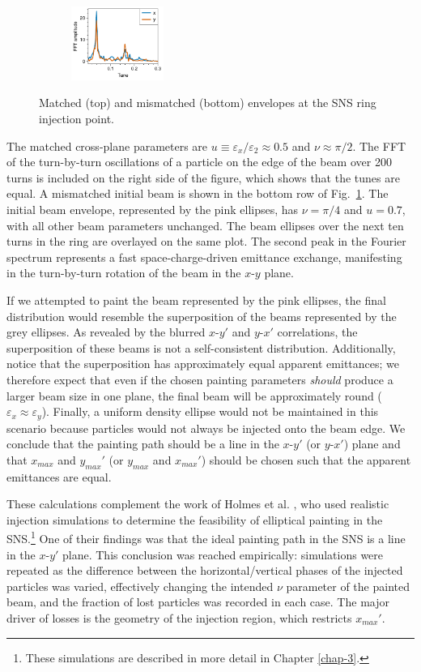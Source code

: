 \begin{figure}[!p]
\begin{subfigure}[b]{\textwidth}
        \includegraphics[width=0.33\textwidth, valign=t]{Images/chapter2/mismatched_env_SNS_fft.pdf}
    \end{subfigure}
    \caption{Matched (top) and mismatched (bottom) envelopes at the SNS ring injection point.}
    \label{fig:matched_env_SNS}
\end{figure}
%
The matched cross-plane parameters are $u \equiv \varepsilon_x / \varepsilon_2 \approx 0.5$ and $\nu \approx \pi / 2$. The FFT of the turn-by-turn oscillations of a particle on the edge of the beam over 200 turns is included on the right side of the figure, which shows that the tunes are equal. A mismatched initial beam is shown in the bottom row of Fig.~\ref{fig:matched_env_SNS}. The initial beam envelope, represented by the pink ellipses, has $\nu = \pi / 4$ and $u = 0.7$, with all other beam parameters unchanged. The beam ellipses over the next ten turns in the ring are overlayed on the same plot. The second peak in the Fourier spectrum represents a fast space-charge-driven emittance exchange, manifesting in the turn-by-turn rotation of the beam in the $x$-$y$ plane. 

If we attempted to paint the beam represented by the pink ellipses, the final distribution would resemble the superposition of the beams represented by the grey ellipses. As revealed by the blurred $x$-$y'$ and $y$-$x'$ correlations, the superposition of these beams is not a self-consistent distribution. Additionally, notice that the superposition has approximately equal apparent emittances; we therefore expect that even if the chosen painting parameters \textit{should} produce a larger beam size in one plane, the final beam will be approximately round ($\varepsilon_x \approx \varepsilon_y$). Finally, a uniform density ellipse would not be maintained in this scenario because particles would not always be injected onto the beam edge. We conclude that the painting path should be a line in the $x$-$y'$ (or $y$-$x'$) plane and that $x_{max}$ and $y_{max}'$ (or $y_{max}$ and $x_{max}'$) should be chosen such that the apparent emittances are equal.

These calculations complement the work of Holmes et al. \cite{Holmes2018}, who used realistic injection simulations to determine the feasibility of elliptical painting in the SNS.\footnote{These simulations are described in more detail in Chapter \ref{chap-3}.} One of their findings was that the ideal painting path in the SNS is a line in the $x$-$y'$ plane. This conclusion was reached empirically: simulations were repeated as the difference between the horizontal/vertical phases of the injected particles was varied, effectively changing the intended $\nu$ parameter of the painted beam, and the fraction of lost particles was recorded in each case. The major driver of losses is the geometry of the injection region, which restricts $x_{max}'$. 

